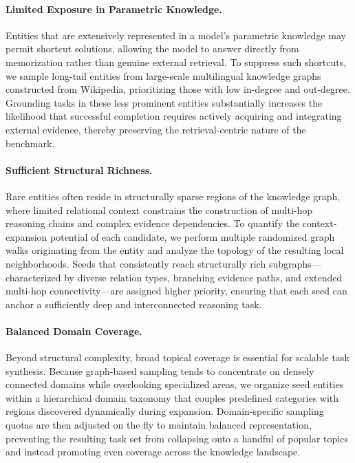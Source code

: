 \documentclass{huawei}
\begin{document}
\paragraph{Limited Exposure in Parametric Knowledge.}
Entities that are extensively represented in a model's parametric knowledge may permit shortcut solutions, allowing the model to answer directly from memorization rather than genuine external retrieval. To suppress such shortcuts, we sample long-tail entities from large-scale multilingual knowledge graphs constructed from Wikipedia, prioritizing those with low in-degree and out-degree. Grounding tasks in these less prominent entities substantially increases the likelihood that successful completion requires actively acquiring and integrating external evidence, thereby preserving the retrieval-centric nature of the benchmark.

\paragraph{Sufficient Structural Richness.} 
Rare entities often reside in structurally sparse regions of the knowledge graph, where limited relational context constrains the construction of multi-hop reasoning chains and complex evidence dependencies. To quantify the context-expansion potential of each candidate, we perform multiple randomized graph walks originating from the entity and analyze the topology of the resulting local neighborhoods. Seeds that consistently reach structurally rich subgraphs—characterized by diverse relation types, branching evidence paths, and extended multi-hop connectivity—are assigned higher priority, ensuring that each seed can anchor a sufficiently deep and interconnected reasoning task.

\paragraph{Balanced Domain Coverage.}
Beyond structural complexity, broad topical coverage is essential for scalable task synthesis. Because graph-based sampling tends to concentrate on densely connected domains while overlooking specialized areas, we organize seed entities within a hierarchical domain taxonomy that couples predefined categories with regions discovered dynamically during expansion. Domain-specific sampling quotas are then adjusted on the fly to maintain balanced representation, preventing the resulting task set from collapsing onto a handful of popular topics and instead promoting even coverage across the knowledge landscape.
\end{document}
